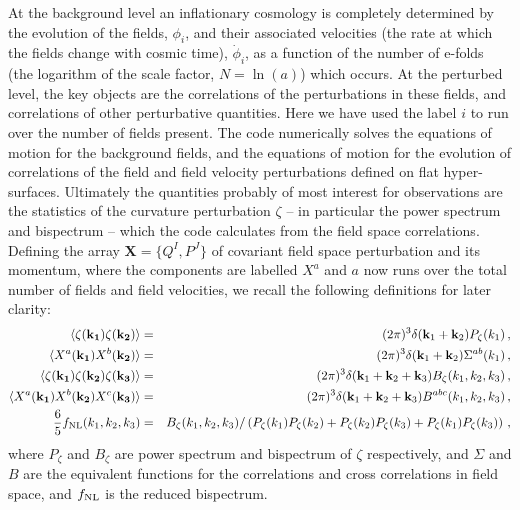 \documentclass[10pt,
amsmath,amssymb,
aps,prd,nofootinbib,eqsecnum,a4paper]{revtex4}
\begin{document}
At the background level an inflationary cosmology is completely determined by the evolution of the 
fields, $\phi_i$, and their associated velocities (the rate at which the fields change with cosmic time), $\dot \phi_i$,
as a function of the number of e-folds (the logarithm of the scale factor, $N=\ln(a)$) which occurs.
At the perturbed level, the key objects are the 
correlations of the perturbations in these fields, 
and correlations of other perturbative quantities.  Here we have used the label $i$ 
to run over the number of fields present. 
The code numerically solves the equations of motion for the background fields, and 
the equations of motion for the evolution of correlations of the field and field velocity perturbations 
defined on flat hyper-surfaces. Ultimately the quantities 
probably of most interest for observations are the statistics of the curvature perturbation 
$\zeta$ -- in particular the power spectrum and bispectrum -- which the code calculates from the 
field space correlations. 
Defining the array ${\mathbf X} = \{{ Q^I}, { P^J} \}$ of covariant field space perturbation and its momentum, where 
the components are labelled $X^a$ and $a$ now runs over the total number of fields and field velocities, 
we recall the following definitions for later clarity:
\begin{eqnarray}
\langle \zeta(\mathbf{k_1}) \zeta(\mathbf{k_2})  \rangle &=& (2\pi)^3 \delta(\mathbf{k}_1 + \mathbf{k}_2 )
        P_\zeta(k_1) \,, \\
\langle X^a(\mathbf{k_1}) X^b(\mathbf{k_2})  \rangle &=& (2\pi)^3 \delta(\mathbf{k}_1 + \mathbf{k}_2 )
        \Sigma^{ab}(k_1) \,, \\
\langle \zeta(\mathbf{k_1}) \zeta(\mathbf{k_2}) \zeta(\mathbf{k_3}) \rangle &=& (2\pi)^3 \delta(\mathbf{k}_1 + \mathbf{k}_2 + \mathbf{k}_3)
        B_\zeta(k_1, k_2, k_3) \,, \\
\langle X^a(\mathbf{k_1}) X^b(\mathbf{k_2}) X^c(\mathbf{k_3}) \rangle &=& (2\pi)^3 \delta(\mathbf{k}_1 + \mathbf{k}_2 + \mathbf{k}_3)
        B^{abc}(k_1, k_2, k_3)\,, \\
        \frac{6}{5}f_{\rm NL}(k_1,k_2,k_3) &=& B_\zeta(k_1,k_2,k_3)/ \left( P_\zeta(k_1)P_\zeta(k_2) + P_\zeta(k_2)P_\zeta(k_3) + P_\zeta(k_1)P_\zeta(k_3) \right ) \, , 
\end{eqnarray}
where $P_\zeta$ and $B_\zeta$ are power spectrum and bispectrum of $\zeta$ respectively, 
and $\Sigma$ and $B$ are 
the equivalent functions for the correlations and cross correlations in field space, and $f_{\rm NL}$ is 
the reduced bispectrum.
\end{document}

